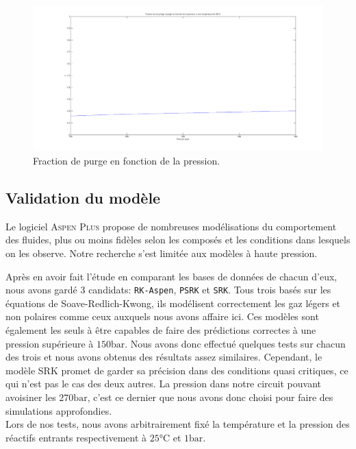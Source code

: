 \begin{figure}[h!]
	\begin{center}
		\includegraphics[scale=0.3]{purge2.png}
	\end{center}
	\caption{Fraction de purge en fonction de la pression.}
	\label{fig:purge2}
\end{figure}


\subsection{Validation du modèle}

Le logiciel \textsc{Aspen Plus} propose de nombreuses 
modélisations du comportement des fluides, 
plus ou moins fidèles selon les composés et 
les conditions dans lesquels on les observe. 
Notre recherche s'est limitée aux modèles à haute pression. 

Après en avoir fait l'étude en comparant les bases de données de chacun d'eux, 
nous avons gardé 3 candidats: \texttt{RK-Aspen}, \texttt{PSRK} et \texttt{SRK}. 
Tous trois basés sur les équations de Soave-Redlich-Kwong, 
ils modélisent correctement les gaz légers et non polaires 
comme ceux auxquels nous avons affaire ici. 
Ces modèles sont également les seuls à être capables de faire 
des prédictions correctes à une pression supérieure à $150\si{\bar}$. 
Nous avons donc effectué quelques tests sur chacun des trois 
et nous avons obtenus des résultats assez similaires.
Cependant, le modèle SRK promet de garder sa précision dans des conditions 
quasi critiques, ce qui n'est pas le cas des deux autres. 
La pression dans notre circuit pouvant avoisiner les $270\si{\bar}$, 
c'est ce dernier que nous avons donc choisi pour faire des simulations approfondies.\\
Lors de nos tests, nous avons arbitrairement fixé la température et 
la pression des réactifs entrants respectivement à $25\si{\degreeCelsius}$ et $1\si{\bar}$.

